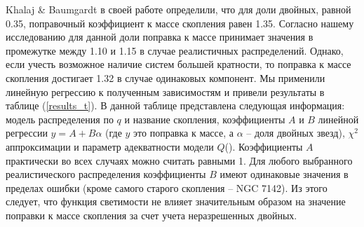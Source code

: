 \documentclass[a4paper,12pt]{article}
\begin{document}
Khalaj \& Baumgardt \cite{Khalaj} в своей работе определили, что для доли двойных, равной 0.35, поправочный коэффициент к массе скопления равен 1.35. Согласно нашему исследованию для данной доли поправка к массе принимает значения в промежутке между 1.10 и 1.15 в случае реалистичных распределений. Однако, если учесть возможное наличие систем большей кратности, то поправка к массе скопления достигает 1.32 в случае одинаковых компонент. Мы применили линейную регрессию к полученным зависимостям и привели результаты в таблице (\ref{results_t}). В данной таблице представлена следующая информация: модель распределения по $q$ и название скопления, коэффициенты $A$ и $B$ линейной регрессии $y = A + B\alpha$ (где $y$ это поправка к массе, а $\alpha$ – доля двойных звезд), ${\chi ^2}$ аппроксимации  и параметр адекватности модели $Q$(\cite{Press}). Коэффициенты $A$ практически во всех случаях можно считать равными 1. Для любого выбранного реалистического распределения коэффициенты $B$ имеют одинаковые значения в пределах ошибки (кроме самого старого скопления -- NGC 7142). Из этого следует, что функция светимости не влияет значительным образом на значение поправки к массе скопления за счет учета неразрешенных двойных.
\end{document}
